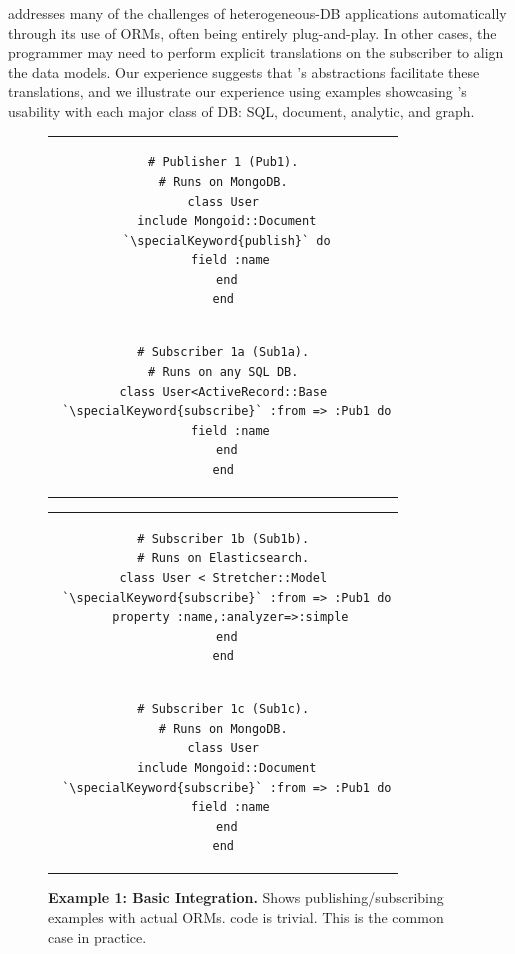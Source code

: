 \label{synapse:sec:examples}

\synapse addresses many of the challenges of heterogeneous-DB applications automatically through its use of ORMs, often being entirely plug-and-play.
In other cases, the programmer may need to perform explicit translations on the subscriber to align the data models.
Our experience suggests that \synapse's abstractions facilitate these translations, and we illustrate our experience using examples showcasing \synapse's usability with each major class of DB: SQL, document, analytic, and graph.

\begin{figure}[t]
\begin{tabular}{c}
\begin{minipage}{.22\textwidth}
\begin{lstlisting}[xleftmargin=1pt,framexleftmargin=1pt]
# Publisher 1 (Pub1).
# Runs on MongoDB.
class User
 include Mongoid::Document
 `\specialKeyword{publish}` do
  field :name
 end
end
\end{lstlisting}
\end{minipage}\vspace{-8pt}\\
\begin{minipage}{.22\textwidth}
\begin{lstlisting}[xleftmargin=1pt,framexleftmargin=1pt]
# Subscriber 1a (Sub1a).
# Runs on any SQL DB.
class User<ActiveRecord::Base
 `\specialKeyword{subscribe}` :from => :Pub1 do
  field :name
 end
end
\end{lstlisting}
\end{minipage}
\end{tabular}\hfill
\begin{tabular}{c}
\begin{minipage}{0.22\textwidth}
\begin{lstlisting}[xleftmargin=1pt,framexleftmargin=1pt]
# Subscriber 1b (Sub1b).
# Runs on Elasticsearch.
class User < Stretcher::Model
 `\specialKeyword{subscribe}` :from => :Pub1 do
  property :name,:analyzer=>:simple
 end
end
\end{lstlisting}
\end{minipage}\vspace{-8pt}\\
\begin{minipage}{0.22\textwidth}
\begin{lstlisting}[xleftmargin=1pt,framexleftmargin=1pt]
# Subscriber 1c (Sub1c).
# Runs on MongoDB.
class User
 include Mongoid::Document
 `\specialKeyword{subscribe}` :from => :Pub1 do
  field :name
 end
end
\end{lstlisting}
\end{minipage}
\end{tabular}
\vspace{-16pt}
\caption{{\bf Example 1: Basic Integration.}
Shows publishing/subscribing examples with actual ORMs.
\synapse code is trivial.  This is the common case in practice.
}
\label{synapse:fig:mongo-to-star}
\end{figure}

